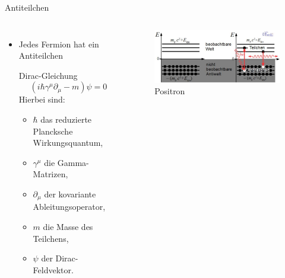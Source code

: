 \documentclass[aspectratio=169,xcolor=dvipsnames]{beamer}
\begin{document}
\begin{frame}{Antiteilchen}
    \begin{columns}[c]
        \begin{itemize}
            \item Jedes Fermion hat ein Antiteilchen
                  \begin{exampleblock}{Dirac-Gleichung}
                      \[
                          \left( i \hbar \gamma^\mu \partial_\mu - m \right) \psi = 0
                      \]
                      Hierbei sind:
                      \begin{itemize}
                          \item \( \hbar \) das reduzierte Plancksche Wirkungsquantum,
                          \item \( \gamma^\mu \) die Gamma-Matrizen,
                          \item \( \partial_\mu \) der kovariante Ableitungsoperator,
                          \item \( m \) die Masse des Teilchens,
                          \item \( \psi \) der Dirac-Feldvektor.
                      \end{itemize}

                  \end{exampleblock}
        \end{itemize}
        \begin{figure}
            \centering
            \includegraphics[width=1\linewidth]{figures/positron.png}
            \caption{Positron} \label{fig:positron}
        \end{figure}
    \end{columns}
\end{frame}
\end{document}
